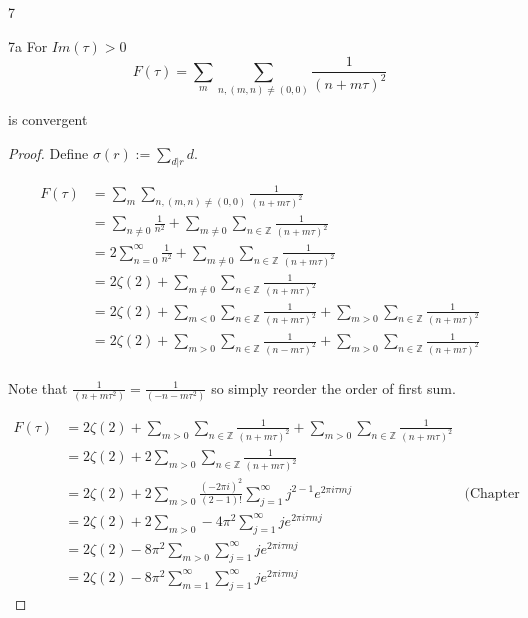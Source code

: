 \documentclass{article}
\newcommand{\Z}{\mathbb{Z}}
\begin{document}
\bigskip

\begin{PROB}{7}\label{Problem 7.}
    
\end{PROB}
\begin{claim}{7a}\label{Claim 7a.}
    For $Im(\tau) > 0$ 
    \begin{equation*}
        F(\tau) = \sum_{m} \sum_{n, (m, n) \neq (0, 0)} \frac{1}{(n + m \tau)^2}
    \end{equation*} 

    is convergent 
\end{claim}
\begin{proof}
    Define $\sigma(r) := \sum_{d | r} d$.  

    \begin{align*}
        F(\tau) &= \sum_{m} \sum_{n, (m, n) \neq (0, 0)} \frac{1}{(n + m \tau)^2} \\
        &= \sum_{n \neq 0} \frac{1}{n^2} + \sum_{m \neq 0} \sum_{n \in \Z} \frac{1}{(n + m \tau)^2} \\
        &= 2\sum_{n = 0}^{\infty} \frac{1}{n^2}+ \sum_{m \neq 0} \sum_{n \in \Z} \frac{1}{(n + m \tau)^2} \\
        &= 2\zeta(2) + \sum_{m \neq 0} \sum_{n \in \Z} \frac{1}{(n + m \tau)^2} \\
        &= 2\zeta(2) + \sum_{m < 0} \sum_{n \in \Z} \frac{1}{(n + m \tau)^2} + \sum_{m > 0} \sum_{n \in \Z} \frac{1}{(n + m \tau)^2} \\
        &= 2\zeta(2) + \sum_{m > 0} \sum_{n \in \Z} \frac{1}{(n - m \tau)^2} + \sum_{m > 0} \sum_{n \in \Z} \frac{1}{(n + m \tau)^2} \\
    \end{align*}

    Note that $\frac{1}{(n + m \tau^2)} = \frac{1}{(-n - m \tau^2)}$ so simply reorder the order of first sum. 
    
    \begin{align*}
        F(\tau) &= 2\zeta(2) + \sum_{m > 0} \sum_{n \in \Z} \frac{1}{(n + m \tau)^2} + \sum_{m > 0} \sum_{n \in \Z} \frac{1}{(n + m \tau)^2} \\
        &= 2\zeta(2) + 2\sum_{m > 0} \sum_{n \in \Z} \frac{1}{(n + m \tau)^2} \\
        &= 2\zeta(2) + 2\sum_{m > 0} \frac{(-2 \pi i)^2}{(2 - 1)!} \sum_{j = 1}^{\infty} j^{2 - 1} e^{2 \pi i \tau m j} & \text{(Chapter 9: Lemma 2.4)}\\
        &= 2\zeta(2) + 2\sum_{m > 0} -4 \pi^2 \sum_{j = 1}^{\infty} j e^{2 \pi i \tau m j}\\
        &= 2\zeta(2) - 8 \pi^2\sum_{m > 0} \sum_{j = 1}^{\infty} j e^{2 \pi i \tau m j}\\
        &=  2\zeta(2) - 8 \pi^2\sum_{m = 1}^{\infty} \sum_{j = 1}^{\infty} j e^{2 \pi i \tau m j}
    \end{align*}


\end{proof}
\end{document}
